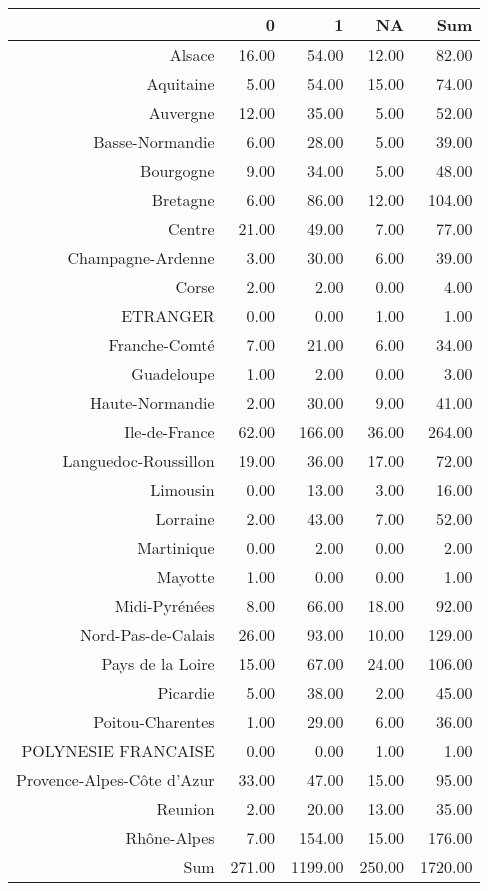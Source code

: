 \documentclass[11pt,a4paper]{article}\usepackage[]{graphicx}\usepackage[]{color}
\begin{document}
\begin{table}[ht]
\centering
\begin{tabular}{rrrrr}
  \hline
 & 0 & 1 & NA & Sum \\ 
  \hline
Alsace & 16.00 & 54.00 & 12.00 & 82.00 \\ 
  Aquitaine & 5.00 & 54.00 & 15.00 & 74.00 \\ 
  Auvergne & 12.00 & 35.00 & 5.00 & 52.00 \\ 
  Basse-Normandie & 6.00 & 28.00 & 5.00 & 39.00 \\ 
  Bourgogne & 9.00 & 34.00 & 5.00 & 48.00 \\ 
  Bretagne & 6.00 & 86.00 & 12.00 & 104.00 \\ 
  Centre & 21.00 & 49.00 & 7.00 & 77.00 \\ 
  Champagne-Ardenne & 3.00 & 30.00 & 6.00 & 39.00 \\ 
  Corse & 2.00 & 2.00 & 0.00 & 4.00 \\ 
  ETRANGER & 0.00 & 0.00 & 1.00 & 1.00 \\ 
  Franche-Comté & 7.00 & 21.00 & 6.00 & 34.00 \\ 
  Guadeloupe & 1.00 & 2.00 & 0.00 & 3.00 \\ 
  Haute-Normandie & 2.00 & 30.00 & 9.00 & 41.00 \\ 
  Ile-de-France & 62.00 & 166.00 & 36.00 & 264.00 \\ 
  Languedoc-Roussillon & 19.00 & 36.00 & 17.00 & 72.00 \\ 
  Limousin & 0.00 & 13.00 & 3.00 & 16.00 \\ 
  Lorraine & 2.00 & 43.00 & 7.00 & 52.00 \\ 
  Martinique & 0.00 & 2.00 & 0.00 & 2.00 \\ 
  Mayotte & 1.00 & 0.00 & 0.00 & 1.00 \\ 
  Midi-Pyrénées & 8.00 & 66.00 & 18.00 & 92.00 \\ 
  Nord-Pas-de-Calais & 26.00 & 93.00 & 10.00 & 129.00 \\ 
  Pays de la Loire & 15.00 & 67.00 & 24.00 & 106.00 \\ 
  Picardie & 5.00 & 38.00 & 2.00 & 45.00 \\ 
  Poitou-Charentes & 1.00 & 29.00 & 6.00 & 36.00 \\ 
  POLYNESIE FRANCAISE & 0.00 & 0.00 & 1.00 & 1.00 \\ 
  Provence-Alpes-Côte d'Azur & 33.00 & 47.00 & 15.00 & 95.00 \\ 
  Reunion & 2.00 & 20.00 & 13.00 & 35.00 \\ 
  Rhône-Alpes & 7.00 & 154.00 & 15.00 & 176.00 \\ 
  Sum & 271.00 & 1199.00 & 250.00 & 1720.00 \\ 
   \hline
\end{tabular}
\end{table}
\end{document}
